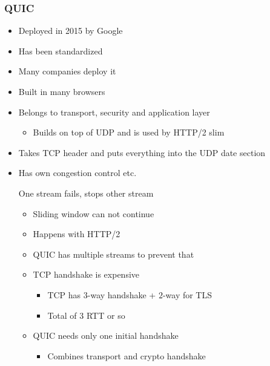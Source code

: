 \subsubsection{QUIC}
\begin{itemize}
    \item Deployed in 2015 by Google
    \item Has been standardized
    \item Many companies deploy it
    \item Built in many browsers
    \item Belongs to transport, security and application layer
        \begin{itemize}
            \item Builds on top of UDP and is used by HTTP/2 slim
        \end{itemize}
    \item Takes TCP header and puts everything into the UDP date section
    \item Has own congestion control etc.
        \begin{itemize}
             One stream fails, stops other stream
                \begin{itemize}
                    \item Sliding window can not continue
                    \item Happens with HTTP/2
                    \item QUIC has multiple streams to prevent that
                \end{itemize}
                \begin{itemize}
                    \item TCP handshake is expensive
                        \begin{itemize}
                            \item TCP has $3$-way handshake + $2$-way for TLS
                            \item Total of $3$ RTT or so
                        \end{itemize}
                    \item QUIC needs only one initial handshake
                        \begin{itemize}
                            \item Combines transport and crypto handshake
                        \end{itemize}

\end{itemize}
\end{itemize}
\end{itemize}
